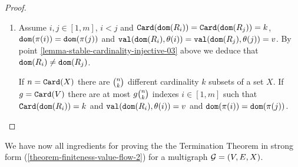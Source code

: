\documentclass{lmcs}
\begin{document}
\begin{proof}
\begin{enumerate}

\item
Assume $i,j \in[1,m]$, $i < j$ and ${\tt Card}({\tt dom}(R_i))={\tt Card}({\tt dom}(R_j))=k$,
${\tt dom}(\pi(i)) = {\tt dom}(\pi(j))$
and ${\tt val}({\tt dom}(R_i),\theta(i))={\tt val}({\tt dom}(R_j),\theta(j))=v$.
By point \ref{lemma-stable-cardinality-injective-03} above
we deduce that ${\tt dom}(R_i) \not = {\tt dom}(R_j)$.

If $n = {\tt Card}(X)$ there are $\newton{n}{k}$ 
different cardinality $k$ subsets of a set $X$. 
If $g={\tt Card}(V)$ there are at most $g\newton{n}{k}$ indexes 
$i\in[1,m]$ such that ${\tt Card}({\tt dom}(R_i))=k$
and ${\tt val}({\tt dom}(R_i),\theta(i))=v$ and 
${\tt dom}(\pi(i)) = {\tt dom}(\pi(j))$. 

\end{enumerate}
\end{proof}

We have now all ingredients for proving the the Termination Theorem
in strong form (\ref{theorem-finiteness-value-flow-2}) for a multigraph ${\mathcal G}=(V,E,X)$.
\\
\end{document}
